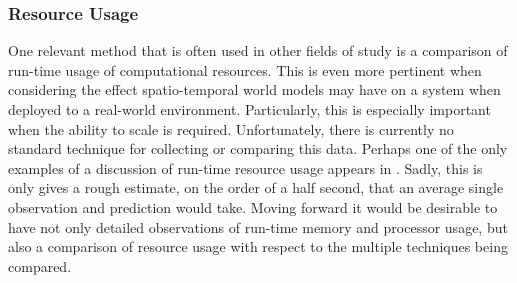   \subsubsection { Resource Usage }

  One relevant method that is often used in other fields of study
  is a comparison of run-time usage of computational resources. This is even
  more pertinent when considering the effect spatio-temporal world models may
  have on a system when deployed to a real-world environment. Particularly, this is especially
  important when the ability to scale is required. Unfortunately, there is currently
  no standard technique for collecting or comparing this data.
  Perhaps one of the only examples of a discussion of run-time resource usage
  appears in \cite{Senanayake2016}.
  Sadly, this is only gives a rough estimate, on the order of a half second,
  that an average single observation and prediction would take. Moving forward
  it would be desirable to have not only detailed observations of run-time
  memory and processor usage, but also a comparison of resource usage with
  respect to the multiple techniques being compared. \\



